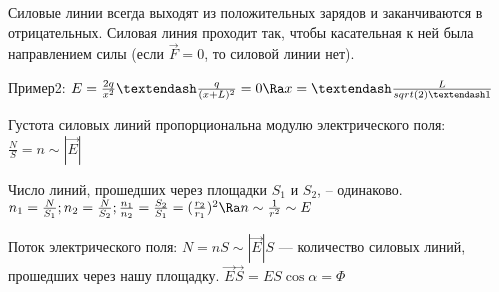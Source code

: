 Силовые линии всегда выходят из положительных зарядов и заканчиваются в отрицательных. Силовая линия проходит так, чтобы касательная к ней была направлением силы (если $\overrightarrow{F} = 0$, то силовой линии нет).

Пример2:  $E = \frac{2q}{x^2} – \frac{q}{(x + L)^2} = 0 \Ra x = – \frac{L}{sqrt(2) – 1}$



Густота силовых линий пропорциональна модулю электрического поля: $\frac{N}{S} = n \sim |\overrightarrow{E}|$


Число линий, прошедших через площадки $S_1$ и $S_2$, – одинаково. $n_1 = \frac{N}{S_1}; n_2 = \frac{N}{S_2}; \frac{n_1}{n_2} = \frac{S_2}{S_1} = (\frac{r_2}{r_1})^2 \Ra n \sim \frac{1}{r^2} \sim E$


Поток электрического поля: $N = nS \sim |\overrightarrow{E}|S$ — количество силовых линий, прошедших через нашу площадку. $\overrightarrow{E}\overrightarrow{S} = ES\cos{\alpha} = \Phi$

